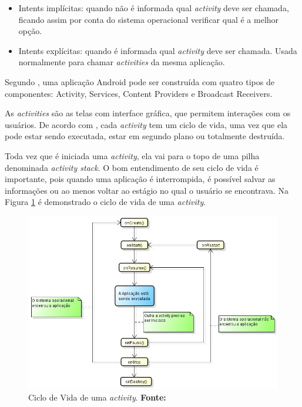 	\begin{itemize}
	  
	  \item Intents implícitas: quando não é informada qual \textit{activity} deve
	  ser chamada, ficando assim por conta do sistema operacional verificar qual é a
	  melhor opção.
	  
	  \item Intents explícitas: quando é informada qual \textit{activity} deve ser chamada.
	  Usada normalmente para chamar \textit{activities} da mesma aplicação.
	  
	\end{itemize}
	
	\par Segundo , uma aplicação Android pode ser construída
com quatro tipos de componentes: Activity, Services, Content Providers e
Broadcast Receivers.

	\par As \textit{activities} são as telas com interface gráfica, que permitem
interações com os usuários. De acordo com , cada
\textit{activity} tem um ciclo de vida, uma vez que ela pode estar sendo
executada, estar em segundo plano ou totalmente destruída.

	\par Toda vez que é iniciada uma \textit{activity}, ela vai para o topo de uma pilha
denominada \textit{activity stack}. O bom entendimento de seu ciclo de vida é
importante, pois quando uma aplicação é interrompida, é possível salvar as
informações ou ao menos voltar ao estágio no qual o usuário se encontrava. Na
Figura \ref{fig:qt1} é demonstrado o ciclo de vida de uma \textit{activity}.

	\begin{figure}[h!]
		\centerline{\includegraphics[scale=0.8]{./imagens/1_q_teorico/qt1.png}}
		\caption[Ciclo de Vida de uma activity]{Ciclo de Vida de uma
		\textit{activity}.
		 \textbf{Fonte:}}
		\label{fig:qt1}
	\end{figure}

